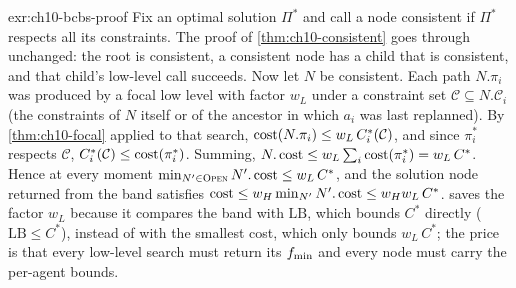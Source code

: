 \begin{solution}{exr:ch10-bcbs-proof}
Fix an optimal solution $\Pi^*$ and call a node consistent if $\Pi^*$ respects all its constraints. The proof of \cref{thm:ch10-consistent} goes through unchanged: the root is consistent, a consistent node has a child that is consistent, and that child's low-level call succeeds. Now let $N$ be consistent. Each path $N.\pi_i$ was produced by a focal low level with factor $w_L$ under a constraint set $\mathcal{C}\subseteq N.\mathcal{C}_i$ (the constraints of $N$ itself or of the ancestor in which $a_i$ was last replanned). By \cref{thm:ch10-focal} applied to that search, $\operatorname{cost}(N.\pi_i)\le w_L\,C_i^*(\mathcal{C})$, and since $\pi_i^*$ respects $\mathcal{C}$, $C_i^*(\mathcal{C})\le\operatorname{cost}(\pi_i^*)$. Summing, $N.\operatorname{cost}\le w_L\sum_i\operatorname{cost}(\pi_i^*)=w_L\,C^*$. Hence at every moment $\min_{N'\in\textsc{Open}}N'.\operatorname{cost}\le w_L\,C^*$, and the solution node returned from the band satisfies $\operatorname{cost}\le w_H\min_{N'}N'.\operatorname{cost}\le w_Hw_L\,C^*$. \ecbs saves the factor $w_L$ because it compares the band with $\mathrm{LB}$, which bounds $C^*$ directly ($\mathrm{LB}\le C^*$), instead of with the smallest cost, which only bounds $w_L\,C^*$; the price is that every low-level search must return its $f_{\min}$ and every node must carry the per-agent bounds.
\end{solution}
